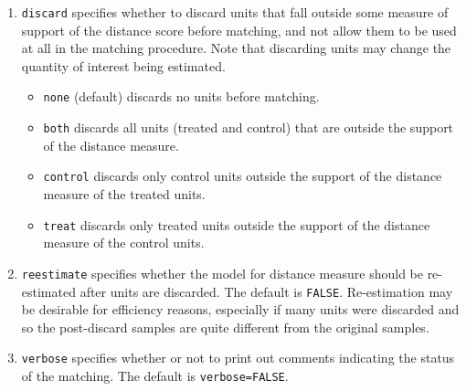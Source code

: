 \documentclass[oneside,letterpaper,titlepage]{article}
\begin{document}
\begin{enumerate}
\item \texttt{discard} specifies whether to discard units that fall
  outside some measure of support of the distance score before matching, and not
  allow them to be used at all in the matching procedure.  Note that discarding
  units may change the quantity of interest being estimated.
  \begin{itemize}
  \item \texttt{none} (default) discards no units before matching. 
  \item \texttt{both} discards all units (treated and control) that are outside the support
    of the distance measure.  
  \item \texttt{control} discards only control units outside the
    support of the distance measure of the treated units.  
  \item \texttt{treat} discards only treated units outside the support
    of the distance measure of the control units.  
  \end{itemize}
  
\item \texttt{reestimate} specifies whether the model for distance
  measure should be re-estimated after units are discarded. The
  default is \texttt{FALSE}.  Re-estimation may be desirable for efficiency
  reasons, especially if many units were discarded and so the
  post-discard samples are quite different from the original samples.

\item \texttt{verbose} specifies whether or not to print out comments indicating the
  status of the matching.  The default is \texttt{verbose=FALSE}.
\end{enumerate}
\end{document}
